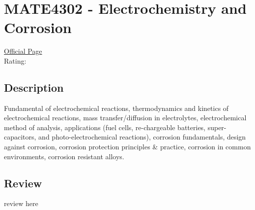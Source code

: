 \hypertarget{MATE4302}{\section{MATE4302 - Electrochemistry and Corrosion}}

\large
\textcolor{turbo_purple}{\href{https://my.uq.edu.au/programs-courses/course.html?course_code=MATE4302}{Official Page}} \\
Rating: \cstar\cstar\cstar\cstar\ostar

\normalsize
\subsection*{Description}
Fundamental of electrochemical reactions, thermodynamics and kinetics of electrochemical reactions, mass transfer/diffusion in electrolytes, electrochemical method of analysis, applications (fuel cells, re-chargeable batteries, super-capacitors, and photo-electrochemical reactions), corrosion fundamentals, design against corrosion, corrosion protection principles \& practice, corrosion in common environments, corrosion resistant alloys.

\subsection*{Review}
review here
